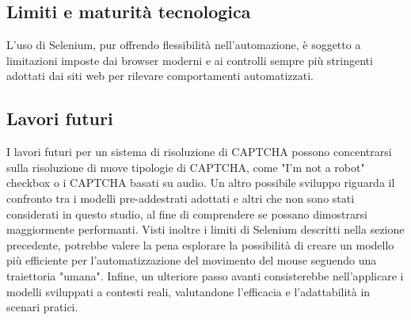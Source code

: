 \documentclass{article}
\begin{document}
\subsection{Limiti e maturità tecnologica}
L'uso di Selenium, pur offrendo flessibilità nell'automazione, è soggetto a limitazioni imposte dai browser moderni e ai controlli sempre più stringenti adottati dai siti web per rilevare comportamenti automatizzati. 

\subsection{Lavori futuri}
I lavori futuri per un sistema di risoluzione di CAPTCHA possono concentrarsi sulla risoluzione di nuove tipologie di CAPTCHA, come "I'm not a robot" checkbox o i CAPTCHA basati su audio. Un altro possibile sviluppo riguarda il confronto tra i modelli pre-addestrati adottati e altri che non sono stati considerati in questo studio, al fine di comprendere se possano dimostrarsi maggiormente performanti. Visti inoltre i limiti di Selenium descritti nella sezione precedente, potrebbe valere la pena esplorare la possibilità di creare un modello più efficiente per l'automatizzazione del movimento del mouse seguendo una traiettoria "umana". Infine, un ulteriore passo avanti consisterebbe nell’applicare i modelli sviluppati a contesti reali, valutandone l’efficacia e l’adattabilità in scenari pratici.
\end{document}

